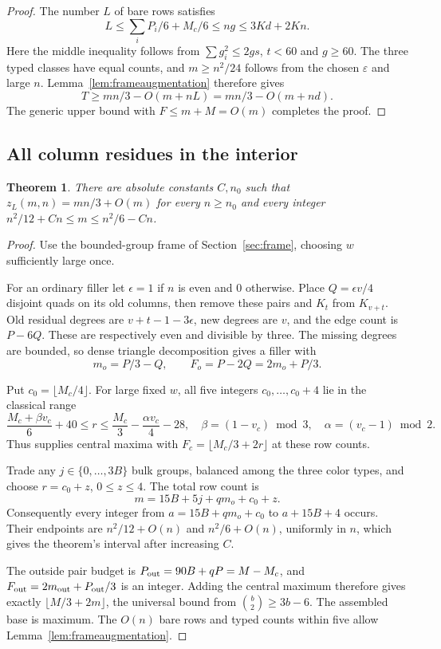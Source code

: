 \documentclass[11pt]{article}
\newtheorem{theorem}{Theorem}
\newcommand{\zl}{z_L}
\begin{document}
\begin{proof}
The number $L$ of bare rows satisfies
\[
 L\le\sum_i P_i/6+M_c/6\le ng\le3Kd+2Kn.
\]
Here the middle inequality follows from
$\sum g_i^2\le2gs$, $t<60$ and $g\ge60$.
The three typed classes have equal counts, and $m\ge n^2/24$ follows
from the chosen $\varepsilon$ and large $n$.
Lemma~\ref{lem:frameaugmentation} therefore gives
\[
 T\ge mn/3-O(m+nL)=mn/3-O(m+nd).
\]
The generic upper bound with
$F\le m+M=O(m)$ completes the proof.
\end{proof}

\subsection{All column residues in the interior}\label{sec:allinterior}
\begin{theorem}\label{thm:allinterior}
There are absolute constants $C,n_0$ such that $\zl(m,n)=mn/3+O(m)$
for every $n\ge n_0$ and every integer $n^2/12+Cn\le m\le n^2/6-Cn$.
\end{theorem}
\begin{proof}
Use the bounded-group frame of Section~\ref{sec:frame}, choosing $w$
sufficiently large once.

For an ordinary filler let $\epsilon=1$ if $n$ is even and $0$ otherwise.
Place $Q=\epsilon v/4$ disjoint quads on its old columns, then remove
these pairs and $K_t$ from $K_{v+t}$. Old residual degrees are
$v+t-1-3\epsilon$, new degrees are $v$, and the edge count is $P-6Q$.
These are respectively even and divisible by three. The missing degrees
are bounded, so dense triangle decomposition gives a filler with
\[
 m_o=P/3-Q,\qquad F_o=P-2Q=2m_o+P/3.
\]

Put $c_0=\lfloor M_c/4\rfloor$. For large fixed $w$, all five integers
$c_0,\ldots,c_0+4$ lie in the classical range
\[
 \frac{M_c+\beta v_c}{6}+40\le r
 \le\frac{M_c}{3}-\frac{\alpha v_c}{4}-28,
 \quad \beta=(1-v_c)\bmod3,\quad\alpha=(v_c-1)\bmod2.
\]
Thus \cite[Theorem 1.3]{chm-unbalanced} supplies central maxima with
$F_c=\lfloor M_c/3+2r\rfloor$ at these row counts.

Trade any $j\in\{0,\ldots,3B\}$ bulk groups, balanced among the three
color types, and choose $r=c_0+z$, $0\le z\le4$. The total row count is
\[
 m=15B+5j+qm_o+c_0+z.
\]
Consequently every integer from $a=15B+qm_o+c_0$ to $a+15B+4$ occurs.
Their endpoints are $n^2/12+O(n)$ and $n^2/6+O(n)$, uniformly in $n$,
which gives the theorem's interval after increasing $C$.

The outside pair budget is $P_{\rm out}=90B+qP=M-M_c$, and
$F_{\rm out}=2m_{\rm out}+P_{\rm out}/3$ is an integer.
Adding the central maximum therefore gives exactly
$\lfloor M/3+2m\rfloor$, the universal bound from
$\binom b2\ge3b-6$. The assembled base is maximum.
The $O(n)$ bare rows and typed counts within five allow
Lemma~\ref{lem:frameaugmentation}.
\end{proof}
\end{document}
